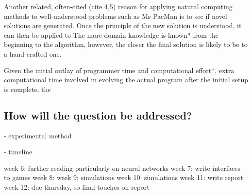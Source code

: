 \documentclass[a4paper,12pt]{article}
\begin{document}
Another related, often-cited (cite 4,5) reason for applying natural computing methods to well-understood problems such as Ms PacMan is to see if novel solutions are generated. Once the principle of the new solution is understood, it can then be applied to The more domain knowledge is known* from the beginning to the algorithm, however, the closer the final solution is likely to be to a hand-crafted one. 

Given the initial outlay of programmer time and computational effort*, extra computational time involved in evolving the actual program after the initial setup is complete, the 

\subsection*{How will the question be addressed?}

- experimental method



- timeline

week 6: further reading particularly on neural networks
week 7: write interfaces to games
week 8: 
week 9: simulations
week 10: simulations
week 11: write report
week 12: due thursday, so final touches on report
\end{document}
